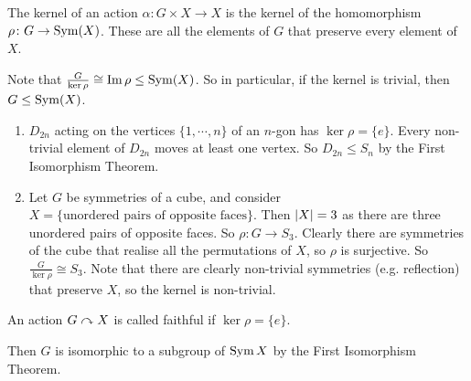 \begin{definition}
	The kernel of an action \(\alpha\colon G \times X \to X\) is the kernel of the homomorphism \(\rho\colon G \to \operatorname{Sym}(X)\).
	These are all the elements of \(G\) that preserve every element of \(X\).
\end{definition}
Note that \(\frac{G}{\ker \rho} \cong \Im \rho \leq \operatorname{Sym}(X)\).
So in particular, if the kernel is trivial, then \(G \leq \operatorname{Sym}(X)\).
\begin{enumerate}
	\item \(D_{2n}\) acting on the vertices \(\{ 1, \cdots, n \}\) of an \(n\)-gon has \(\ker\rho = \{ e \}\).
	      Every non-trivial element of \(D_{2n}\) moves at least one vertex.
	      So \(D_{2n} \leq S_n\) by the First Isomorphism Theorem.
	\item Let \(G\) be symmetries of a cube, and consider \(X = \{ \text{unordered pairs of opposite faces} \}\).
	      Then \(\abs{X} = 3\) as there are three unordered pairs of opposite faces.
	      So \(\rho\colon G \to S_3\).
	      Clearly there are symmetries of the cube that realise all the permutations of \(X\), so \(\rho\) is surjective.
	      So \(\frac{G}{\ker \rho} \cong S_3\).
	      Note that there are clearly non-trivial symmetries (e.g.
	      reflection) that preserve \(X\), so the kernel is non-trivial.
\end{enumerate}
\begin{definition}
	An action \(G \curvearrowright X\) is called faithful if \(\ker \rho = \{ e \}\).
\end{definition}
Then \(G\) is isomorphic to a subgroup of \(\operatorname{Sym} X\) by the First Isomorphism Theorem.

